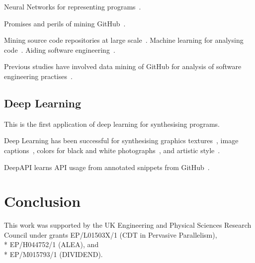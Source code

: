 \documentclass[preprint,nonatbib,10pt,nocopyrightspace]{sigplanconf}
\begin{document}
Neural Networks for representing programs~\cite{Bunel}.

Promises and perils of mining GitHub~\cite{Bird2009}.

Mining source code repositories at large
scale~\cite{Allamanis2013a,White2015a}. Machine learning for analysing
code~\cite{Allamanis2014a,Raychev}. Aiding software
engineering~\cite{Allamanis2014,Bird2015}.

Previous studies have involved data mining of GitHub for analysis of
software engineering
practises~\cite{Wu2014,Guzman2014,Baishakhi2014a,Vasilescu2015}.


\subsection{Deep Learning}

This is the first application of deep learning for synthesising
programs.

Deep Learning has been successful for synthesising graphics
textures~\cite{Gatys2015a}, image captions~\cite{Vinyals}, colors for
black and white photographs~\cite{Zhang2016}, and artistic
style~\cite{Gatys2015}.

DeepAPI learns API usage from annotated snippets from
GitHub~\cite{Zhang2015a}.


\section{Conclusion}\label{sec:conclusion}



\acks

This work was supported by the UK Engineering and Physical Sciences
Research Council under grants EP/L01503X/1 (CDT in Pervasive
Parallelism),\\* EP/H044752/1 (ALEA), and\\* EP/M015793/1 (DIVIDEND).


\label{bibliography}
\printbibliography
\end{document}
